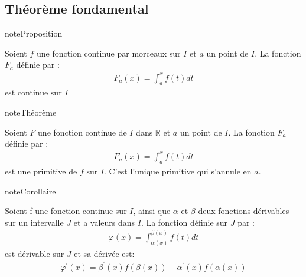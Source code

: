 \documentclass[letterpaper,10pt,french]{jupyterBook}
\begin{document}
\subsection{Théorème fondamental}
\label{\detokenize{pintfc:theoreme-fondamental}}
\begin{sphinxadmonition}{note}{Proposition}

\sphinxAtStartPar
Soient \(f\) une fonction continue par morceaux sur \(I\) et \(a\) un point de \(I\). La fonction \(F_a\) définie par :
\begin{equation*}
\begin{split}
F_a(x) = \int_a^x f(t) dt
\end{split}
\end{equation*}
\sphinxAtStartPar
est continue sur \(I\)
\end{sphinxadmonition}

\begin{sphinxadmonition}{note}{Théorème}

\sphinxAtStartPar
Soient \(F\) une fonction continue de \(I\) dans \(\mathbb{R}\) et \(a\) un point de \(I\). La fonction \(F_a\) définie par :
\begin{equation*}
\begin{split}
F_a(x) = \int_a^x f(t) dt
\end{split}
\end{equation*}
\sphinxAtStartPar
est une primitive de \(f\) sur \(I\). C’est l’unique primitive qui s’annule en \(a\).
\end{sphinxadmonition}

\begin{sphinxadmonition}{note}{Corollaire}

\sphinxAtStartPar
Soient f une fonction continue sur \(I\), ainsi que \(\alpha\) et \(\beta\) deux fonctions dérivables sur un intervalle \(J\) et a valeurs dans \(I\). La fonction définie sur \(J\) par :
\begin{equation*}
\begin{split}
\varphi(x) = \int_{\alpha(x)}^{\beta(x)} f(t) dt
\end{split}
\end{equation*}
\sphinxAtStartPar
est dérivable sur \(J\) et sa dérivée est:
\begin{equation*}
\begin{split}
\varphi^{'}(x) = \beta^{'}(x)f(\beta(x))- \alpha^{'}(x)f(\alpha(x))
\end{split}
\end{equation*}\end{sphinxadmonition}
\end{document}
